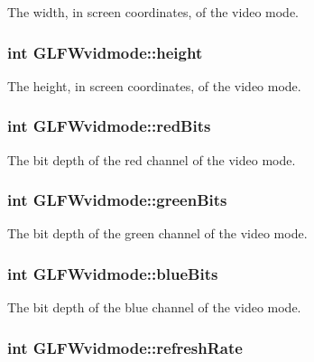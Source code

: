 The width, in screen coordinates, of the video mode. \hypertarget{struct_g_l_f_wvidmode_c65942a5f6981695517437a9d571d03c}{
\subsubsection[height]{\setlength{\rightskip}{0pt plus 5cm}int {\bf GLFWvidmode::height}}}
\label{struct_g_l_f_wvidmode_c65942a5f6981695517437a9d571d03c}


The height, in screen coordinates, of the video mode. \hypertarget{struct_g_l_f_wvidmode_6066c4ecd251098700062d3b735dba1b}{
\subsubsection[redBits]{\setlength{\rightskip}{0pt plus 5cm}int {\bf GLFWvidmode::redBits}}}
\label{struct_g_l_f_wvidmode_6066c4ecd251098700062d3b735dba1b}


The bit depth of the red channel of the video mode. \hypertarget{struct_g_l_f_wvidmode_292fdd281f3485fb3ff102a5bda43faa}{
\subsubsection[greenBits]{\setlength{\rightskip}{0pt plus 5cm}int {\bf GLFWvidmode::greenBits}}}
\label{struct_g_l_f_wvidmode_292fdd281f3485fb3ff102a5bda43faa}


The bit depth of the green channel of the video mode. \hypertarget{struct_g_l_f_wvidmode_f310977f58d2e3b188175b6e3d314047}{
\subsubsection[blueBits]{\setlength{\rightskip}{0pt plus 5cm}int {\bf GLFWvidmode::blueBits}}}
\label{struct_g_l_f_wvidmode_f310977f58d2e3b188175b6e3d314047}


The bit depth of the blue channel of the video mode. \hypertarget{struct_g_l_f_wvidmode_791bdd6c7697b09f7e9c97054bf05649}{
\subsubsection[refreshRate]{\setlength{\rightskip}{0pt plus 5cm}int {\bf GLFWvidmode::refreshRate}}}
\label{struct_g_l_f_wvidmode_791bdd6c7697b09f7e9c97054bf05649}


